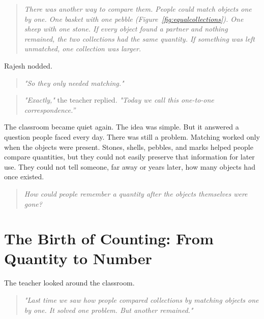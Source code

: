 \documentclass[11pt]{article}
\begin{document}
\begin{quote}
\emph{There was another way to compare them. People could match objects one by one. One basket with one pebble (Figure~\ref{fig:equalcollections}). One sheep with one stone.
If every object found a partner and nothing remained, the two collections had the same quantity. If something was left unmatched, one collection was larger.}
\end{quote}
Rajesh nodded.
\begin{quote}
\emph{"So they  only needed matching."}
\end{quote}
\begin{quote}
\emph{"Exactly,"} the teacher replied. \emph{"Today we call this \emph{one-to-one correspondence}.''}
\end{quote}
The classroom became quiet again. The idea was simple. But it answered a question people faced every day. There was still a problem. Matching worked only when the objects were present. Stones, shells, pebbles, and marks helped people compare quantities, but they could not easily preserve that information for later use. They could not tell someone, far away or years later, how many objects had once existed. 
\begin{quote}
\emph{How could people remember a quantity after the objects themselves were gone?}
\end{quote}



\section*{\textcolor{countinggreen}{The Birth of Counting: From Quantity to Number}}

The teacher looked around the classroom.
\begin{quote}
\emph{"Last time  we saw how people compared collections by matching objects one by one. It solved one problem. But another remained."}
\end{quote}


\end{document}
